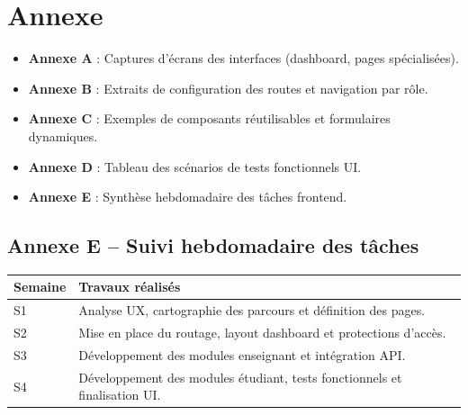 \chapter*{Annexe}

\begin{itemize}
  \item \textbf{Annexe A} : Captures d'écrans des interfaces (dashboard, pages spécialisées).
  \item \textbf{Annexe B} : Extraits de configuration des routes et navigation par rôle.
  \item \textbf{Annexe C} : Exemples de composants réutilisables et formulaires dynamiques.
  \item \textbf{Annexe D} : Tableau des scénarios de tests fonctionnels UI.
  \item \textbf{Annexe E} : Synthèse hebdomadaire des tâches frontend.
\end{itemize}

\section*{Annexe E -- Suivi hebdomadaire des tâches}
\begin{tabularx}{\textwidth}{lX}
\toprule
\textbf{Semaine} & \textbf{Travaux réalisés} \\
\midrule
S1 & Analyse UX, cartographie des parcours et définition des pages. \\
S2 & Mise en place du routage, layout dashboard et protections d'accès. \\
S3 & Développement des modules enseignant et intégration API. \\
S4 & Développement des modules étudiant, tests fonctionnels et finalisation UI. \\
\bottomrule
\end{tabularx}
